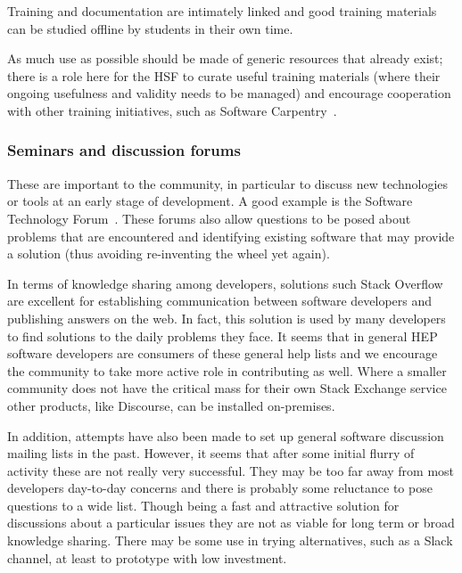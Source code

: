 \documentclass[12pt,a4paper]{article}
\begin{document}
Training and documentation are intimately linked and good training
materials can be studied offline by students in their own time.

As much use as possible should be made of generic resources that already
exist; there is a role here for the HSF to curate useful training
materials (where their ongoing usefulness and validity needs to be
managed) and encourage cooperation with other training initiatives, such
as Software Carpentry~\cite{SoftwareCarpentry}.

\hypertarget{seminars-and-discussion-forums}{%
\subsubsection{Seminars and discussion
forums}\label{seminars-and-discussion-forums}}

These are important to the community, in particular to discuss new
technologies or tools at an early stage of development. A good example
is the Software Technology
Forum~\cite{SoftwareTechForum}. These forums also allow questions to be posed
about problems that are encountered and identifying existing software that may provide
a solution (thus avoiding re-inventing the wheel yet again).

In terms of knowledge sharing among developers, solutions such
Stack Overflow are excellent for establishing
communication between software developers and publishing answers on
the web. In fact, this solution is used by many developers to find
solutions to the daily problems they face. It seems that in general
HEP software developers are consumers of these general help lists and we
encourage the community to take more active role in contributing as
well. Where a smaller community does not have the critical mass for
their own Stack Exchange service other products, like Discourse, can be
installed on-premises.

In addition, attempts have also been made to set up general software
discussion mailing lists in the past. However, it seems that after some
initial flurry of activity these are not really very successful. They
may be too far away from most developers day-to-day concerns and there
is probably some reluctance to pose questions to a wide list. Though
being a fast and attractive solution for discussions about a particular
issues they are not as viable for long term or broad knowledge sharing.
There may be some use in trying alternatives, such as a Slack channel,
at least to prototype with low investment.
\end{document}
